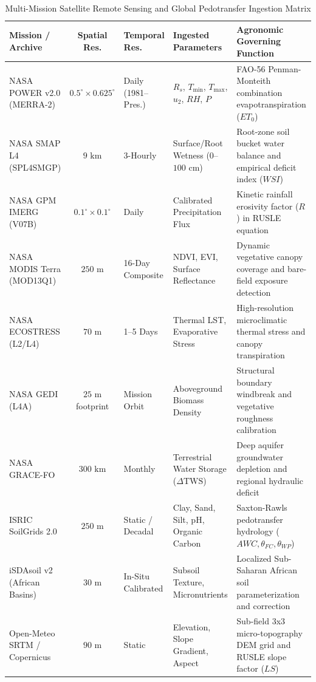 \documentclass[10pt,twocolumn]{article}
\begin{document}
\begin{table}[t]
\centering
\caption{Multi-Mission Satellite Remote Sensing and Global Pedotransfer Ingestion Matrix}
\label{tab:data_sources}
\small
\begin{tabularx}{\textwidth}{lcp{3.2cm}p{3.5cm}X}
\toprule
\textbf{Mission / Archive} & \textbf{Spatial Res.} & \textbf{Temporal Res.} & \textbf{Ingested Parameters} & \textbf{Agronomic Governing Function} \\
\midrule
NASA POWER v2.0 (MERRA-2) & $0.5^\circ \times 0.625^\circ$ & Daily (1981--Pres.) & $R_s$, $T_{\min}$, $T_{\max}$, $u_2$, $RH$, $P$ & FAO-56 Penman-Monteith combination evapotranspiration ($ET_0$) \\
NASA SMAP L4 (SPL4SMGP) & $9\text{ km}$ & 3-Hourly & Surface/Root Wetness ($0$--$100\text{ cm}$) & Root-zone soil bucket water balance and empirical deficit index ($WSI$) \\
NASA GPM IMERG (V07B) & $0.1^\circ \times 0.1^\circ$ & Daily & Calibrated Precipitation Flux & Kinetic rainfall erosivity factor ($R$) in RUSLE equation \\
NASA MODIS Terra (MOD13Q1) & $250\text{ m}$ & 16-Day Composite & NDVI, EVI, Surface Reflectance & Dynamic vegetative canopy coverage and bare-field exposure detection \\
NASA ECOSTRESS (L2/L4) & $70\text{ m}$ & 1--5 Days & Thermal LST, Evaporative Stress & High-resolution microclimatic thermal stress and canopy transpiration \\
NASA GEDI (L4A) & $25\text{ m}$ footprint & Mission Orbit & Aboveground Biomass Density & Structural boundary windbreak and vegetative roughness calibration \\
NASA GRACE-FO & $300\text{ km}$ & Monthly & Terrestrial Water Storage ($\Delta\text{TWS}$) & Deep aquifer groundwater depletion and regional hydraulic deficit \\
ISRIC SoilGrids 2.0 & $250\text{ m}$ & Static / Decadal & Clay, Sand, Silt, pH, Organic Carbon & Saxton-Rawls pedotransfer hydrology ($AWC, \theta_{FC}, \theta_{WP}$) \\
iSDAsoil v2 (African Basins) & $30\text{ m}$ & In-Situ Calibrated & Subsoil Texture, Micronutrients & Localized Sub-Saharan African soil parameterization and correction \\
Open-Meteo SRTM / Copernicus & $90\text{ m}$ & Static & Elevation, Slope Gradient, Aspect & Sub-field 3x3 micro-topography DEM grid and RUSLE slope factor ($LS$) \\
\bottomrule
\end{tabularx}
\end{table}
\end{document}
